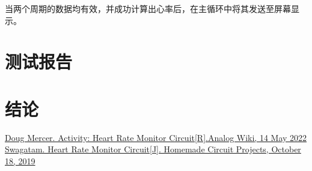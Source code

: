 \documentclass[a4paper]{ctexart}
\begin{document}
	当两个周期的数据均有效，并成功计算出心率后，在主循环中将其发送至屏幕显示。

\newpage
\section{测试报告}

\newpage
\section{结论}

\newpage
\begin{thebibliography}{20}
	\href{https://wiki.analog.com/university/courses/alm1k/alm-lab-heart-rate-mon}{Doug Mercer. Activity: Heart Rate Monitor Circuit[R].Analog Wiki, 14 May 2022}
	\href{https://www.homemade-circuits.com/heart-rate-monitor-alarm-circuit/}{Swagatam. Heart Rate Monitor Circuit[J]. Homemade Circuit Projects, October 18, 2019}
\end{thebibliography}
\end{document}
